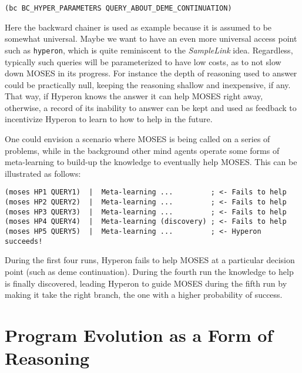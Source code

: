 \documentclass[]{report}
\begin{document}
\begin{verbatim}
(bc BC_HYPER_PARAMETERS QUERY_ABOUT_DEME_CONTINUATION)
\end{verbatim}
Here the backward chainer is used as example because it is assumed to
be somewhat universal.  Maybe we want to have an even more universal
access point such as \texttt{hyperon}, which is quite
reminiscent to the \emph{SampleLink} idea.  Regardless, typically such
queries will be parameterized to have low costs, as to not slow down
MOSES in its progress.  For instance the depth of reasoning used to
answer could be practically null, keeping the reasoning shallow and
inexpensive, if any.  That way, if Hyperon knows the answer it can
help MOSES right away, otherwise, a record of its inability to answer
can be kept and used as feedback to incentivize Hyperon to learn to
how to help in the future.

One could envision a scenario where MOSES is being called on a series
of problems, while in the background other mind agents operate some
forms of meta-learning to build-up the knowledge to eventually help
MOSES.  This can be illustrated as follows:

{\small
\begin{verbatim}
(moses HP1 QUERY1)  |  Meta-learning ...         ; <- Fails to help
(moses HP2 QUERY2)  |  Meta-learning ...         ; <- Fails to help
(moses HP3 QUERY3)  |  Meta-learning ...         ; <- Fails to help
(moses HP4 QUERY4)  |  Meta-learning (discovery) ; <- Fails to help
(moses HP5 QUERY5)  |  Meta-learning ...         ; <- Hyperon succeeds!
\end{verbatim}
} During the first four runs, Hyperon fails to help MOSES at a
particular decision point (such as deme continuation).  During the
fourth run the knowledge to help is finally discovered, leading
Hyperon to guide MOSES during the fifth run by making it take the
right branch, the one with a higher probability of success.

\section{Program Evolution as a Form of Reasoning}
\label{sec:prgevoreason}
\end{document}
